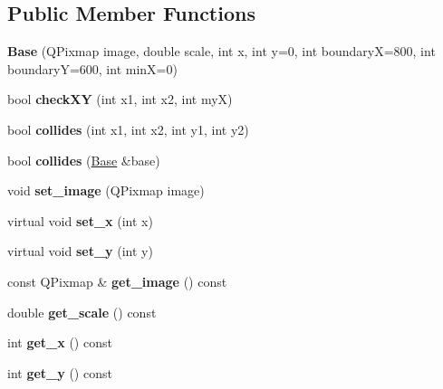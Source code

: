 \subsection*{Public Member Functions}
\begin{DoxyCompactItemize}
\item 
\mbox{\label{classgame_1_1Base_a6fed1f3f4013af8df52b7ae684098eaa}} 
{\bfseries Base} (Q\+Pixmap image, double scale, int x, int y=0, int boundaryX=800, int boundaryY=600, int minX=0)
\item 
\mbox{\label{classgame_1_1Base_acfcb672c526e57890b5b1ef5fca75d09}} 
bool {\bfseries check\+XY} (int x1, int x2, int myX)
\item 
\mbox{\label{classgame_1_1Base_a340843de63ea2bc812a9dcfa4e34e9fb}} 
bool {\bfseries collides} (int x1, int x2, int y1, int y2)
\item 
\mbox{\label{classgame_1_1Base_ae742c89dd481a35971a4f659af0d3745}} 
bool {\bfseries collides} (\hyperlink{classgame_1_1Base}{Base} \&base)
\item 
\mbox{\label{classgame_1_1Base_a4ef01159e220d435dd973c945b802977}} 
void {\bfseries set\+\_\+image} (Q\+Pixmap image)
\item 
\mbox{\label{classgame_1_1Base_ab96cb70ffa0984d650f8a261663fde92}} 
virtual void {\bfseries set\+\_\+x} (int x)
\item 
\mbox{\label{classgame_1_1Base_aab1afbed41cd255238a3cc107fe1611e}} 
virtual void {\bfseries set\+\_\+y} (int y)
\item 
\mbox{\label{classgame_1_1Base_abc4f0e87b3ce03d2b7c0e3cba1505f8c}} 
const Q\+Pixmap \& {\bfseries get\+\_\+image} () const
\item 
\mbox{\label{classgame_1_1Base_a986b0970cc262be86bfe4337f86f3ba1}} 
double {\bfseries get\+\_\+scale} () const
\item 
\mbox{\label{classgame_1_1Base_a9a03e074b91babc5b004467a1749d4b8}} 
int {\bfseries get\+\_\+x} () const
\item 
\mbox{\label{classgame_1_1Base_ad5016f89e800d05f91fd56c9f16d472e}} 
int {\bfseries get\+\_\+y} () const
\end{DoxyCompactItemize}
